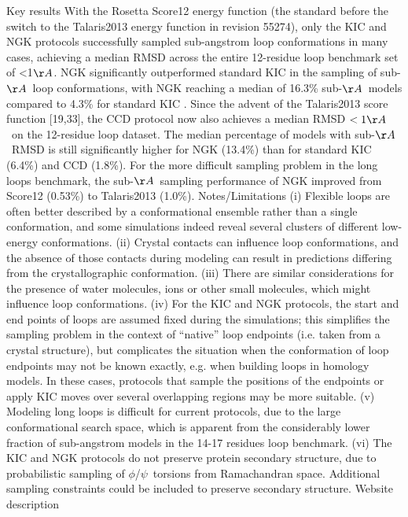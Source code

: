 Key results
With the Rosetta Score12 energy function (the standard before the switch to the Talaris2013 energy function in revision 55274), only the KIC \cite{mandell_sub-angstrom_2009} and NGK \cite{stein_improvements_2013} protocols successfully sampled sub-angstrom loop conformations in many cases, achieving a median RMSD across the entire 12-residue loop benchmark set of <1$\AA$. NGK significantly outperformed standard KIC in the sampling of sub-$\AA$\ loop conformations, with NGK reaching a median of 16.3\% sub-$\AA$\ models compared to 4.3\% for standard KIC \cite{stein_improvements_2013}. Since the advent of the Talaris2013 score function [19,33], the CCD protocol now also achieves a median RMSD $< 1\AA$\ on the 12-residue loop dataset. The median percentage of models with sub-$\AA$\ RMSD is still significantly higher for NGK (13.4\%) than for standard KIC (6.4\%) and CCD (1.8\%). For the more difficult sampling problem in the long loops benchmark, the sub-$\AA$\ sampling performance of NGK improved from Score12 (0.53\%) to Talaris2013 (1.0\%).
Notes/Limitations
(i) Flexible loops are often better described by a conformational ensemble rather than a single conformation, and some simulations indeed reveal several clusters of different low-energy conformations. (ii) Crystal contacts can influence loop conformations, and the absence of those contacts during modeling can result in predictions differing from the crystallographic conformation. (iii) There are similar considerations for the presence of water molecules, ions or other small molecules, which might influence loop conformations. (iv) For the KIC and NGK protocols, the start and end points of loops are assumed fixed during the simulations; this simplifies the sampling problem in the context of “native” loop endpoints (i.e. taken from a crystal structure), but complicates the situation when the conformation of loop endpoints may not be known exactly, e.g. when building loops in homology models. In these cases, protocols that sample the positions of the endpoints or apply KIC moves over several overlapping regions may be more suitable. (v) Modeling long loops is difficult for current protocols, due to the large conformational search space, which is apparent from the considerably lower fraction of sub-angstrom models in the 14-17 residues loop benchmark. (vi) The KIC and NGK protocols do not preserve protein secondary structure, due to probabilistic sampling of $\phi$/$\psi$\ torsions from Ramachandran space. Additional sampling constraints could be included to preserve secondary structure.
Website description

